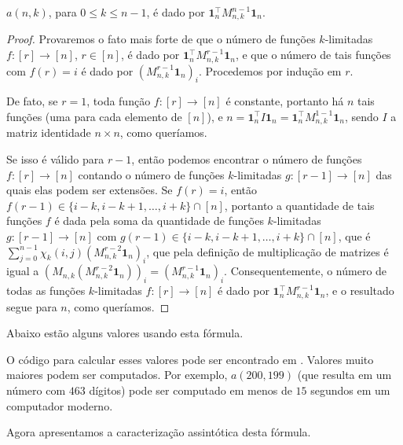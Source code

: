 \begin{theorem} \label{th:matrix-form-n-to-n}
  $a(n,k)$, para $0 \le k \le n - 1$, é dado por $\mathbf{1}_n^\intercal M_{n,k}^{n-1} \mathbf{1}_n$.
\end{theorem}
\begin{proof}
  Provaremos o fato mais forte de que o número de funções $k$-limitadas $f : [r] \to [n]$, $r \in [n]$, é dado por $\mathbf{1}_n^\intercal M_{n,k}^{r - 1} \mathbf{1}_n$, e que o número de tais funções com $f(r) = i$ é dado por $(M_{n,k}^{r - 1} \mathbf{1}_n)_i$. Procedemos por indução em $r$.

  De fato, se $r = 1$, toda função $f : [r] \to [n]$ é constante, portanto há $n$ tais funções (uma para cada elemento de $[n]$), e $n = \mathbf{1}_n^\intercal I \mathbf{1}_n = \mathbf{1}_n^\intercal M_{n,k}^{1 - 1} \mathbf{1}_n$, sendo $I$ a matriz identidade $n \times n$, como queríamos.

  Se isso é válido para $r - 1$, então podemos encontrar o número de funções $f : [r] \to [n]$ contando o número de funções $k$-limitadas $g : [r-1] \to [n]$ das quais elas podem ser extensões. Se $f(r) = i$, então $f(r - 1) \in \{i - k, i - k + 1, \dots, i + k\} \cap [n]$, portanto a quantidade de tais funções $f$ é dada pela soma da quantidade de funções $k$-limitadas $g : [r-1] \to [n]$ com $g(r-1) \in \{i - k, i - k + 1, \dots, i + k\} \cap [n]$, que é $\sum_{j = 0}^{n-1} \chi_k(i, j) (M_{n,k}^{r-2} \mathbf{1}_n)_i$, que pela definição de multiplicação de matrizes é igual a $(M_{n,k} (M_{n,k}^{r-2} \mathbf{1}_n))_i = (M_{n,k}^{r-1} \mathbf{1}_n)_i$. Consequentemente, o número de todas as funções $k$-limitadas $f : [r] \to [n]$ é dado por $\mathbf{1}_n^\intercal M_{n,k}^{r-1} \mathbf{1}_n$, e o resultado segue para $n$, como queríamos.

\end{proof}

Abaixo estão alguns valores usando esta fórmula.



O código para calcular esses valores pode ser encontrado em \cite{github}. Valores muito maiores podem ser computados. Por exemplo, $a(200,199)$ (que resulta em um número com $463$ dígitos) pode ser computado em menos de $15$ segundos em um computador moderno.

Agora apresentamos a caracterização assintótica desta fórmula.

